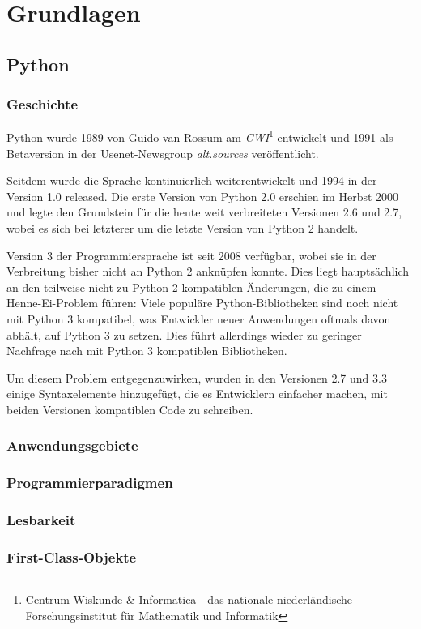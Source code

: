 \chapter{Grundlagen}

\section{Python}

\subsection{Geschichte}

Python wurde 1989 von Guido van Rossum am \emph{CWI}\footnote{Centrum Wiskunde \& Informatica - das
nationale niederländische Forschungsinstitut für Mathematik und Informatik} entwickelt und 1991 als
Betaversion in der Usenet-Newsgroup \emph{alt.sources} veröffentlicht.

Seitdem wurde die Sprache kontinuierlich weiterentwickelt und 1994 in der Version 1.0 released. Die
erste Version von Python 2.0 erschien im Herbst 2000 und legte den Grundstein für die heute weit
verbreiteten Versionen 2.6 und 2.7, wobei es sich bei letzterer um die letzte Version von Python 2
handelt.

Version 3 der Programmiersprache ist seit 2008 verfügbar, wobei sie in der Verbreitung bisher nicht
an Python 2 anknüpfen konnte. Dies liegt hauptsächlich an den teilweise nicht zu Python 2
kompatiblen Änderungen, die zu einem Henne-Ei-Problem führen: Viele populäre Python-Bibliotheken
sind noch nicht mit Python 3 kompatibel, was Entwickler neuer Anwendungen oftmals davon abhält, auf
Python 3 zu setzen. Dies führt allerdings wieder zu geringer Nachfrage nach mit Python 3 kompatiblen
Bibliotheken.

Um diesem Problem entgegenzuwirken, wurden in den Versionen 2.7 und 3.3 einige Syntaxelemente
hinzugefügt, die es Entwicklern einfacher machen, mit beiden Versionen kompatiblen Code zu
schreiben.


\subsection{Anwendungsgebiete}


\subsection{Programmierparadigmen}


\subsection{Lesbarkeit}


\subsection{First-Class-Objekte}


